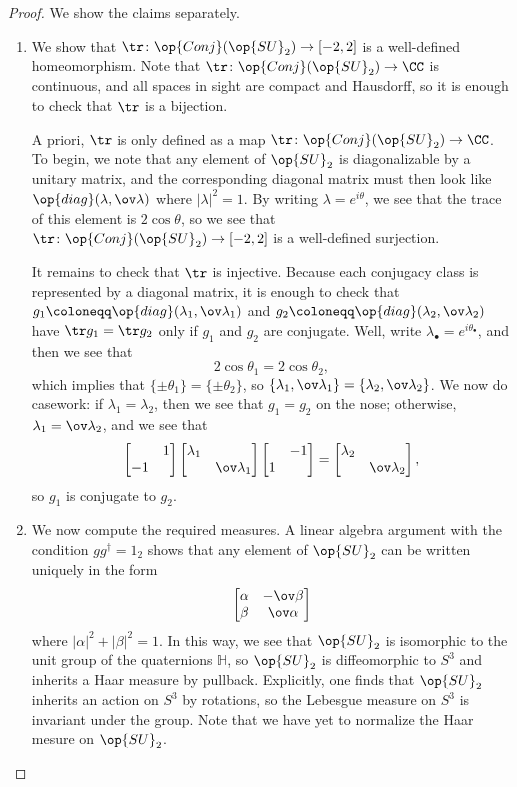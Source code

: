 \documentclass[../thesis.tex]{subfiles}
\begin{document}
\begin{proof}
	We show the claims separately.
	\begin{enumerate}
		\item We show that $\tr\colon\op{Conj}({\op{SU}_2})\to[-2,2]$ is a well-defined homeomorphism. Note that $\tr\colon\op{Conj}({\op{SU}_2})\to\CC$ is continuous, and all spaces in sight are compact and Hausdorff, so it is enough to check that $\tr$ is a bijection.
		
		A priori, $\tr$ is only defined as a map $\tr\colon\op{Conj}({\op{SU}_2})\to\CC$. To begin, we note that any element of $\op{SU}_2$ is diagonalizable by a unitary matrix, and the corresponding diagonal matrix must then look like $\op{diag}(\lambda,\ov\lambda)$ where $\left|\lambda\right|^2=1$. By writing $\lambda=e^{i\theta}$, we see that the trace of this element is $2\cos\theta$, so we see that $\tr\colon\op{Conj}({\op{SU}_2})\to[-2,2]$ is a well-defined surjection.

		It remains to check that $\tr$ is injective. Because each conjugacy class is represented by a diagonal matrix, it is enough to check that $g_1\coloneqq\op{diag}(\lambda_1,\ov\lambda_1)$ and $g_2\coloneqq\op{diag}(\lambda_2,\ov\lambda_2)$ have $\tr g_1=\tr g_2$ only if $g_1$ and $g_2$ are conjugate. Well, write $\lambda_\bullet=e^{i\theta_\bullet}$, and then we see that
		\[2\cos\theta_1=2\cos\theta_2,\]
		which implies that $\{\pm\theta_1\}=\{\pm\theta_2\}$, so $\{\lambda_1,\ov\lambda_1\}=\{\lambda_2,\ov\lambda_2\}$. We now do casework: if $\lambda_1=\lambda_2$, then we see that $g_1=g_2$ on the nose; otherwise, $\lambda_1=\ov\lambda_2$, and we see that
		\[\begin{bmatrix}
			& 1 \\
			-1
		\end{bmatrix}\begin{bmatrix}
			\lambda_1 \\ & \ov\lambda_1
		\end{bmatrix}\begin{bmatrix}
			& -1 \\ 1
		\end{bmatrix}=\begin{bmatrix}
			\lambda_2 \\ & \ov\lambda_2
		\end{bmatrix},\]
		so $g_1$ is conjugate to $g_2$.

		\item We now compute the required measures. A linear algebra argument with the condition $gg^\dagger=1_2$ shows that any element of $\op{SU}_2$ can be written uniquely in the form
		\[\begin{bmatrix}
			\alpha & -\ov\beta \\
			\beta & \ov\alpha
		\end{bmatrix}\]
		where $\left|\alpha\right|^2+\left|\beta\right|^2=1$. In this way, we see that $\op{SU}_2$ is isomorphic to the unit group of the quaternions $\mathbb H$, so $\op{SU}_2$ is diffeomorphic to $S^3$ and inherits a Haar measure by pullback. Explicitly, one finds that $\op{SU}_2$ inherits an action on $S^3$ by rotations, so the Lebesgue measure on $S^3$ is invariant under the group. Note that we have yet to normalize the Haar mesure on $\op{SU}_2$.


\end{enumerate}
\end{proof}
\end{document}
